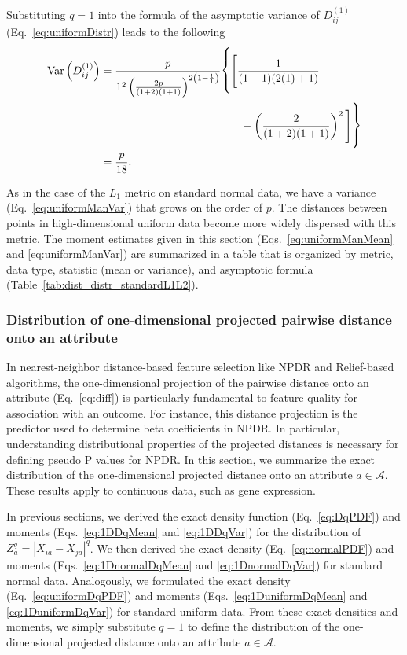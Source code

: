 \documentclass[aoas]{imsart}
\begin{document}
Substituting $q=1$ into the formula of the asymptotic variance of $D^{(1)}_{ij}$ (Eq.~\ref{eq:uniformDistr}) leads to the following
%
\begin{equation}\label{eq:uniformManVar}
\begin{aligned}
\text{Var}\left(D^{(1)}_{ij}\right) &= \frac{p}{1^2\left(\frac{2p}{(1 + 2)(1 + 1)}\right)^{2\left(1 - \frac{1}{1}\right)}} {\fontsize{0.5cm}{1pt}\selectfont \Biggr\{}{\Biggl[}\frac{1}{(1 + 1)(2(1) + 1)}\\
&\hspace{4.5cm}- \left(\frac{2}{(1 + 2)(1 + 1)}\right)^2{\Biggr]}{\fontsize{0.5cm}{1pt}\selectfont \Biggr\}} \\
&= \frac{p}{18}.
\end{aligned}
\end{equation}

As in the case of the $L_1$ metric on standard normal data, we have a variance (Eq.~\ref{eq:uniformManVar}) that grows on the order of $p$. The distances between points in high-dimensional uniform data become more widely dispersed with this metric. The moment estimates given in this section (Eqs.~\ref{eq:uniformManMean} and \ref{eq:uniformManVar}) are summarized in a table that is organized by metric, data type, statistic (mean or variance), and asymptotic formula (Table~\ref{tab:dist_distr_standardL1L2}).

\subsubsection{Distribution of one-dimensional projected pairwise distance onto an attribute}\label{sec:continuous_diff}

In nearest-neighbor distance-based feature selection like NPDR and Relief-based algorithms, the one-dimensional projection of the pairwise distance onto an attribute (Eq.~\ref{eq:diff}) is particularly fundamental to feature quality for association with an outcome. For instance, this distance projection is the predictor used to determine beta coefficients in NPDR. In particular, understanding distributional properties of the projected distances is necessary for defining pseudo P values for NPDR. In this section, we summarize the exact distribution of the one-dimensional projected distance onto an attribute $a \in \mathcal{A}$. These results apply to continuous data, such as gene expression. 

In previous sections, we derived the exact density function (Eq.~\ref{eq:DqPDF}) and moments (Eqs.~\ref{eq:1DDqMean} and \ref{eq:1DDqVar}) for the distribution of $Z^q_a=|X_{ia}-X_{ja}|^q$. We then derived the exact density (Eq.~\ref{eq:normalPDF}) and moments (Eqs.~\ref{eq:1DnormalDqMean} and \ref{eq:1DnormalDqVar}) for standard normal data. Analogously, we formulated the exact density (Eq.~\ref{eq:uniformDqPDF}) and moments (Eqs.~\ref{eq:1DuniformDqMean} and \ref{eq:1DuniformDqVar}) for standard uniform data. From these exact densities and moments, we simply substitute $q=1$ to define the distribution of the one-dimensional projected distance onto an attribute $a \in \mathcal{A}$.
\end{document}
